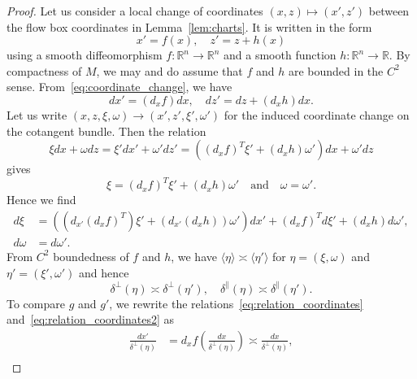\documentclass[AHL,Unicode,longabstracts,published]{cedram}
\newcommand{\bbR}{\mathbb{R}}
\newcommand{\bbR}{\mathbb{R}}
\begin{document}
\begin{proof}
Let us consider a local change of coordinates $(x,z)\mapsto(x',z')$ between the flow box coordinates in Lemma~\ref{lem:charts}. It is written in the form
\begin{equation}\label{eq:coordinate_change}
x'=f\left(x\right),\quad z'=z+h\left(x\right)
\end{equation}
using a smooth diffeomorphism $f:\bbR^{n}\rightarrow\bbR^{n}$ and a smooth function $h:\bbR^{n}\rightarrow\bbR$. By compactness of $M$, we may and do assume that $f$ and $h$ are bounded in the $C^{2}$ sense. From~\eqref{eq:coordinate_change}, we have
\begin{equation}\label{eq:relation_coordinates}
dx'=\left(d_{x}f\right)dx,\quad dz'=dz+\left(d_{x}h\right)dx.
\end{equation}
Let us write $(x,z,\xi,\omega)\to(x',z',\xi',\omega')$ for the induced coordinate change on the cotangent bundle. Then the relation
\[
\xi dx+\omega dz=\xi'dx'+\omega'dz'=\left(\left(d_{x}f\right)^{T}\xi'+\left(d_{x}h\right)\omega'\right)dx+\omega'dz
\]
gives
\begin{equation}\label{eq:dd}
\xi=\left(d_{x}f\right)^{T}\xi'+\left(d_{x}h\right)\omega'\quad\text{and}\quad\omega=\omega'.
\end{equation}
Hence we find
\begin{equation}\label{eq:relation_coordinates2}
\begin{split}
d\xi & =\left(\left(d_{x'}\left(d_{x}f\right)^{T}\right)\xi'+\left(d_{x'}\left(d_{x}h\right)\right)\omega'\right)dx'+\left(d_{x}f\right)^{T}d\xi'+\left(d_{x}h\right)d\omega',
\\
d\omega & =d\omega'.
\end{split}
\end{equation}
From $C^{2}$ boundedness of $f$ and $h$, we have $\langle \eta\rangle \asymp\langle \eta'\rangle $ for $\eta=(\xi,\omega)$ and $\eta'=(\xi',\omega')$ and hence
\begin{equation}\label{eq:equivalence_of_delta}
\delta^{\perp}\left(\eta\right)\asymp\delta^{\perp}\left(\eta'\right),\quad\delta^{\parallel}\left(\eta\right)\asymp\delta^{\parallel}\left(\eta'\right).
\end{equation}
To compare $g$ and $g'$, we rewrite the relations~\eqref{eq:relation_coordinates} and~\eqref{eq:relation_coordinates2} as
\begin{align*}
\frac{dx'}{\delta^{\perp}\left(\eta\right)} & =d_{x}f\left(\frac{dx}{\delta^{\perp}\left(\eta\right)}\right)\asymp\frac{dx}{\delta^{\perp}\left(\eta\right)},\\

\end{align*}
\end{proof}
\end{document}
